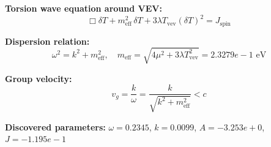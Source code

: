 
\textbf{Torsion wave equation around VEV:}
\begin{equation}
  \Box \delta T + m_{\text{eff}}^2 \, \delta T + 3\lambda T_{\text{vev}} (\delta T)^2 = J_{\text{spin}}
\end{equation}

\textbf{Dispersion relation:}
\begin{equation}
  \omega^2 = k^2 + m_{\text{eff}}^2, \quad
  m_{\text{eff}} = \sqrt{4\mu^2 + 3\lambda T_{\text{vev}}^2} = 2.3279e-1 \text{ eV}
\end{equation}

\textbf{Group velocity:}
\begin{equation}
  v_g = \frac{k}{\omega} = \frac{k}{\sqrt{k^2 + m_{\text{eff}}^2}} < c
\end{equation}

\textbf{Discovered parameters:}
$\omega = 0.2345$, \quad
$k = 0.0099$, \quad
$A = -3.253e+0$, \quad
$J = -1.195e-1$